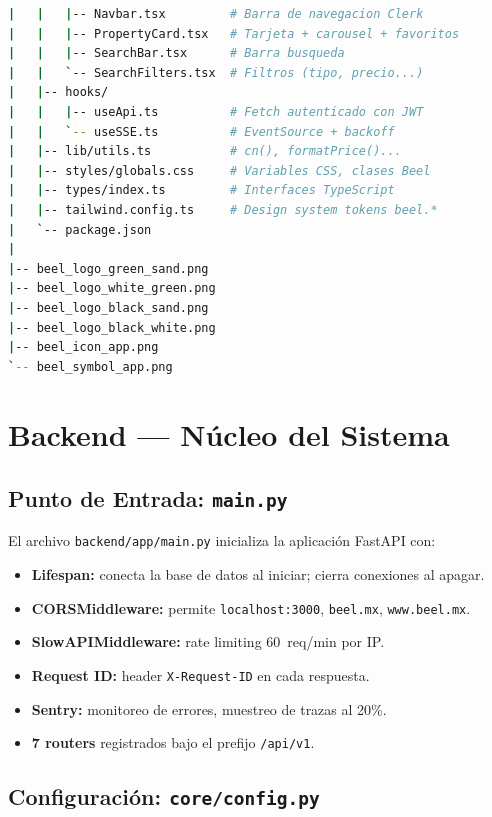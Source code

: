 \documentclass[12pt,a4paper]{report}
\begin{document}
\begin{lstlisting}[language=bash, caption={Arbol completo del repositorio Beel}]
|   |   |-- Navbar.tsx         # Barra de navegacion Clerk
|   |   |-- PropertyCard.tsx   # Tarjeta + carousel + favoritos
|   |   |-- SearchBar.tsx      # Barra busqueda
|   |   `-- SearchFilters.tsx  # Filtros (tipo, precio...)
|   |-- hooks/
|   |   |-- useApi.ts          # Fetch autenticado con JWT
|   |   `-- useSSE.ts          # EventSource + backoff
|   |-- lib/utils.ts           # cn(), formatPrice()...
|   |-- styles/globals.css     # Variables CSS, clases Beel
|   |-- types/index.ts         # Interfaces TypeScript
|   |-- tailwind.config.ts     # Design system tokens beel.*
|   `-- package.json
|
|-- beel_logo_green_sand.png
|-- beel_logo_white_green.png
|-- beel_logo_black_sand.png
|-- beel_logo_black_white.png
|-- beel_icon_app.png
`-- beel_symbol_app.png
\end{lstlisting}

\chapter{Backend --- N\'ucleo del Sistema}

\section{Punto de Entrada: \texttt{main.py}}

El archivo \texttt{backend/app/main.py} inicializa la aplicaci\'on FastAPI con:

\begin{itemize}[leftmargin=*]
  \item \textbf{Lifespan:} conecta la base de datos al iniciar; cierra conexiones al apagar.
  \item \textbf{CORSMiddleware:} permite \texttt{localhost:3000}, \texttt{beel.mx}, \texttt{www.beel.mx}.
  \item \textbf{SlowAPIMiddleware:} rate limiting 60~req/min por IP.
  \item \textbf{Request ID:} header \texttt{X-Request-ID} en cada respuesta.
  \item \textbf{Sentry:} monitoreo de errores, muestreo de trazas al 20\%.
  \item \textbf{7 routers} registrados bajo el prefijo \texttt{/api/v1}.
\end{itemize}

\section{Configuraci\'on: \texttt{core/config.py}}
\end{document}
